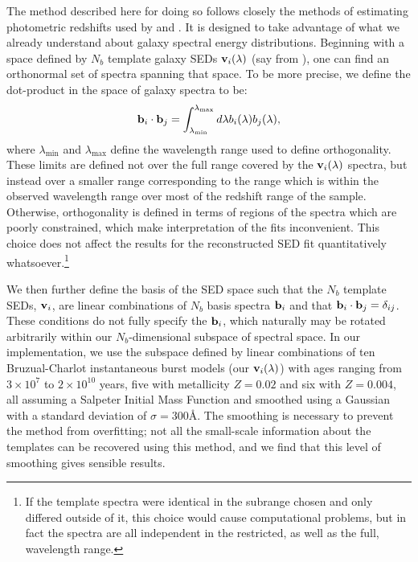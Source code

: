 \documentclass[10pt,preprint]{aastex}
\newcommand{\vv}[1]{{\bf #1}}
\begin{document}
The method described here for doing so follows closely the methods of
estimating photometric redshifts used by \citet{csabai00a} and
\citet{budavari00a}. It is designed to take advantage of what we
already understand about galaxy spectral energy distributions.
Beginning with a space defined by $N_b$ template galaxy SEDs
$\vv{v}_i(\lambda)$ (say from \citealt{bruzual93a}), one can find an
orthonormal set of spectra spanning that space. To be more precise, we
define the dot-product in the space of galaxy spectra to be:
\begin{equation}
\vv{b}_i \cdot \vv{b}_j =
\int_{\lambda_{\mathrm{min}}}^{\lambda_{\mathrm{max}}} d\lambda
b_i(\lambda) b_j(\lambda),
\end{equation}
where $\lambda_{\mathrm{min}}$ and $\lambda_{\mathrm{max}}$ define the
wavelength range used to define orthogonality. These limits are
defined not over the full range covered by the $\vv{v}_i(\lambda)$
spectra, but instead over a smaller range corresponding to the range
which is within the observed wavelength range over most of the
redshift range of the sample. Otherwise, orthogonality is defined in
terms of regions of the spectra which are poorly constrained, which
make interpretation of the fits inconvenient.  This choice does not
affect the results for the reconstructed SED fit quantitatively
whatsoever.\footnote{If the template spectra were identical in the
subrange chosen and only differed outside of it, this choice would
cause computational problems, but in fact the spectra are all
independent in the restricted, as well as the full, wavelength range.}

We then further define the basis of the SED space such that the $N_b$
template SEDs, $\vv{v}_i$, are linear combinations of $N_b$ basis
spectra $\vv{b}_i$ and that $\vv{b}_i \cdot \vv{b}_j =
\delta_{ij}$. These conditions do not fully specify the $\vv{b}_i$,
which naturally may be rotated arbitrarily within our
$N_b$-dimensional subspace of spectral space.  In our implementation,
we use the subspace defined by linear combinations of ten
Bruzual-Charlot instantaneous burst models (our $\vv{v}_i(\lambda)$)
with ages ranging from $3 \times 10^7$ to $2\times 10^{10}$ years,
five with metallicity $Z=0.02$ and six with $Z=0.004$, all assuming a
Salpeter Initial Mass Function and smoothed using a Gaussian with a
standard deviation of $\sigma = 300$\AA. The smoothing is necessary
to prevent the method from overfitting; not all the small-scale
information about the templates can be recovered using this method,
and we find that this level of smoothing gives sensible results.
\end{document}

